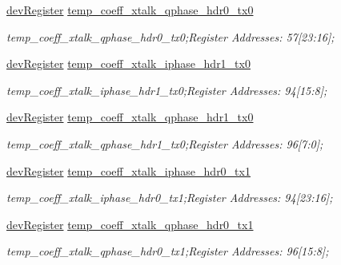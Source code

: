 \begin{DoxyCompactItemize}
\mbox{\hyperlink{classdev_register}{dev\+Register}} \mbox{\hyperlink{class_o_p_t3101_registers_a3899282f5b276b29c747cb8afa3268c5}{temp\+\_\+coeff\+\_\+xtalk\+\_\+qphase\+\_\+hdr0\+\_\+tx0}}
\begin{DoxyCompactList}\small\item\em temp\+\_\+coeff\+\_\+xtalk\+\_\+qphase\+\_\+hdr0\+\_\+tx0;Register Addresses\+: 57\mbox{[}23\+:16\mbox{]}; \end{DoxyCompactList}\item 
\mbox{\hyperlink{classdev_register}{dev\+Register}} \mbox{\hyperlink{class_o_p_t3101_registers_a4f2109c27d0b9cc1753fca44f6d53120}{temp\+\_\+coeff\+\_\+xtalk\+\_\+iphase\+\_\+hdr1\+\_\+tx0}}
\begin{DoxyCompactList}\small\item\em temp\+\_\+coeff\+\_\+xtalk\+\_\+iphase\+\_\+hdr1\+\_\+tx0;Register Addresses\+: 94\mbox{[}15\+:8\mbox{]}; \end{DoxyCompactList}\item 
\mbox{\hyperlink{classdev_register}{dev\+Register}} \mbox{\hyperlink{class_o_p_t3101_registers_a0584be9a54e3fb76023976c2cc43e421}{temp\+\_\+coeff\+\_\+xtalk\+\_\+qphase\+\_\+hdr1\+\_\+tx0}}
\begin{DoxyCompactList}\small\item\em temp\+\_\+coeff\+\_\+xtalk\+\_\+qphase\+\_\+hdr1\+\_\+tx0;Register Addresses\+: 96\mbox{[}7\+:0\mbox{]}; \end{DoxyCompactList}\item 
\mbox{\hyperlink{classdev_register}{dev\+Register}} \mbox{\hyperlink{class_o_p_t3101_registers_a7a1b4bbca989ba8a2075475fe9f5d5db}{temp\+\_\+coeff\+\_\+xtalk\+\_\+iphase\+\_\+hdr0\+\_\+tx1}}
\begin{DoxyCompactList}\small\item\em temp\+\_\+coeff\+\_\+xtalk\+\_\+iphase\+\_\+hdr0\+\_\+tx1;Register Addresses\+: 94\mbox{[}23\+:16\mbox{]}; \end{DoxyCompactList}\item 
\mbox{\hyperlink{classdev_register}{dev\+Register}} \mbox{\hyperlink{class_o_p_t3101_registers_a0c4fa853e53a75c3b137c6d5e6f3889c}{temp\+\_\+coeff\+\_\+xtalk\+\_\+qphase\+\_\+hdr0\+\_\+tx1}}
\begin{DoxyCompactList}\small\item\em temp\+\_\+coeff\+\_\+xtalk\+\_\+qphase\+\_\+hdr0\+\_\+tx1;Register Addresses\+: 96\mbox{[}15\+:8\mbox{]}; \end{DoxyCompactList}\item 

\end{DoxyCompactItemize}
